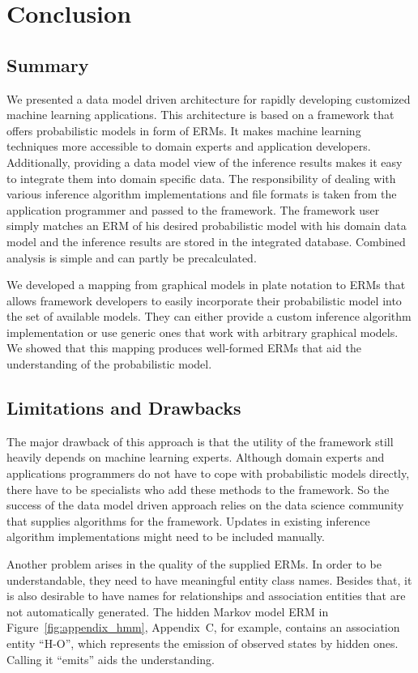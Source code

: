 \section{Conclusion}

\subsection{Summary}

We presented a data model driven architecture for rapidly developing customized machine learning applications. This architecture is based on a framework that offers probabilistic models in form of ERMs. It makes machine learning techniques more accessible to domain experts and application developers. Additionally, providing a data model view of the inference results makes it easy to integrate them into domain specific data. The responsibility of dealing with various inference algorithm implementations and file formats is taken from the application programmer and passed to the framework. The framework user simply matches an ERM of his desired probabilistic model with his domain data model and the inference results are stored in the integrated database. Combined analysis is simple and can partly be precalculated.

We developed a mapping from graphical models in plate notation to ERMs that allows framework developers to easily incorporate their probabilistic model into the set of available models. They can either provide a custom inference algorithm implementation or use generic ones that work with arbitrary graphical models. We showed that this mapping produces well-formed ERMs that aid the understanding of the probabilistic model.

\subsection{Limitations and Drawbacks}

The major drawback of this approach is that the utility of the framework still heavily depends on machine learning experts. Although domain experts and applications programmers do not have to cope with probabilistic models directly, there have to be specialists who add these methods to the framework. So the success of the data model driven approach relies on the data science community that supplies algorithms for the framework. Updates in existing inference algorithm implementations might need to be included manually.

Another problem arises in the quality of the supplied ERMs. In order to be understandable, they need to have meaningful entity class names. Besides that, it is also desirable to have names for relationships and association entities that are not automatically generated. The hidden Markov model ERM in Figure~\ref{fig:appendix_hmm}, Appendix~C, for example, contains an association entity ``H-O'', which represents the emission of observed states by hidden ones. Calling it ``emits'' aids the understanding.

